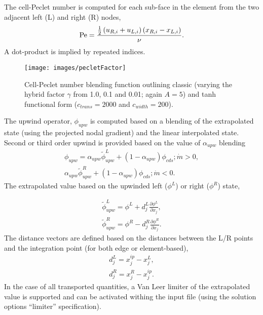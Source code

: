 The cell-Peclet number is computed for each sub-face in the element
from the two adjacent left (L) and right (R) nodes,
\begin{equation}
   {\rm Pe} = {{{1 \over 2} \left( u_{R,i} + u_{L,i} \right) 
                      \left( x_{R,i} - x_{L,i} \right) } \over \nu }.
\end{equation}
A dot-product is implied by repeated indices. 

\begin{figure} [h]
\centerline{\texttt{[image: images/pecletFactor]}}
\vspace{0.1in}
\caption{Cell-Peclet number blending function outlining classic (varying the hybrid factor $\gamma$ from 1.0, 0.1 and 0.01; again $A=5$) and tanh functional form ($c_{trans}=2000$ and $c_{width}=200$).}
\label{pec-blend}
\end{figure}
 
The upwind operator, $\phi_{upw}$ is computed based on a blending of the extrapolated
state (using the projected nodal gradient) and the linear interpolated state. Second 
or third order upwind is provided based on the value of $\alpha_{upw}$ blending
\begin{eqnarray}
 \phi_{upw} = \alpha_{upw}\tilde \phi^L_{upw} + \left(1-\alpha_{upw}\right)\phi_{cds}; \dot m > 0, \nonumber \\
             \alpha_{upw}\tilde\phi^R_{upw} + \left(1-\alpha_{upw}\right)\phi_{cds}; \dot m < 0.
\label{phiUpwindFull}
\end{eqnarray}
The extrapolated value based on the upwinded left ($\phi^L$) or right ($\phi^R$) state,

\begin{eqnarray}
  \tilde \phi^L_{upw} = \phi^L + d^L_j \frac{\partial \phi^L }{\partial x_j}, \nonumber \\
  \tilde \phi^R_{upw} = \phi^R - d^R_j \frac{\partial \phi^R }{\partial x_j}.
\label{advUpwLR}
\end{eqnarray}
%
The distance vectors are defined based on the distances between the L/R points and the integration point 
(for both edge or element-based),
\begin{eqnarray}
  d^L_j = x^{ip}_j - x^L_j, \nonumber \\
  d^R_j = x^R_j - x^{ip}_j. 
\end{eqnarray}
\label{distanceVec}
In the case of all transported quantities, a Van Leer limiter of the extrapolated value is supported
and can be activated withing the input file (using the solution options ``limiter'' specification).

